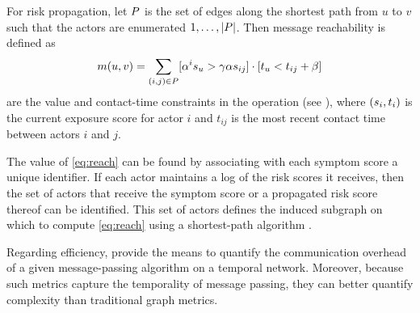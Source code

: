 For risk propagation, let $P$ is the set of edges along the shortest path from $u$ to $v$ such that the actors are enumerated $1, \ldots, \left\vert P \right\vert$. Then message reachability is defined as
%
\begin{equation}\label{eq:reach}
  m(u, v) = \sum_{(i, j) \in P} [\alpha^{i} s_u > \gamma \alpha s_{ij}] \cdot [t_u < t_{ij} + \beta]
\end{equation}
%
are the value and contact-time constraints in the \cShouldContactReceive[] operation (see ), where $(s_i, t_i)$ is the current exposure score for actor $i$ and $t_{ij}$ is the most recent contact time between actors $i$ and $j$.

The value of \eqref{eq:reach} can be found by associating with each symptom score a unique identifier. If each actor maintains a log of the risk scores it receives, then the set of actors that receive the symptom score or a propagated risk score thereof can be identified. This set of actors defines the induced subgraph on which to compute \eqref{eq:reach} using a shortest-path algorithm \cite{Johnson1977}. 

Regarding efficiency,  provide the means to quantify the communication overhead of a given message-passing algorithm on a temporal network. Moreover, because such metrics capture the temporality of message passing, they can better quantify complexity than traditional graph metrics.

